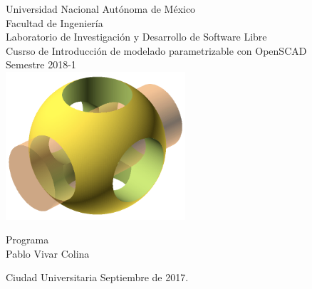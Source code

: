 \begin{titlepage}
     \begin{center}
     
	
	
	\Large Universidad Nacional Autónoma de México\\[1.5cm]
        	
        
        \Large Facultad de Ingeniería\\[1.5cm]
         \Large Laboratorio de Investigación y Desarrollo de Software Libre\\[1.5cm]
         
        \Large
        Cusrso de Introducción de modelado parametrizable con OpenSCAD\\[1.5cm]
        \Large Semestre 2018-1\\[1.5cm]
        
        \includegraphics[width=0.5\textwidth]{OpenSCAD-logo.png}
        
        \Large Programa\\[1cm]
         \Large Pablo Vivar Colina\\[1cm]

          \begin{flushleft}
        \footnotesize Ciudad Universitaria Septiembre de 2017.\\
          \end{flushleft}
         
          
   \end{center}
\end{titlepage}